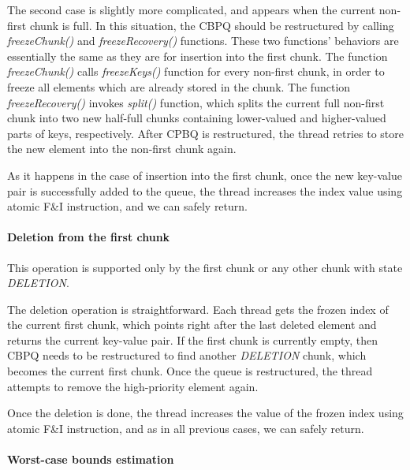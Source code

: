 \documentclass{article}
\begin{document}
The second case is slightly more complicated, and appears when the current non-first chunk is full. In this situation, the CBPQ should be restructured by calling \textit{freezeChunk()} and \textit{freezeRecovery()} functions. These two functions' behaviors are essentially the same as they are for insertion into the first chunk. The function \textit{freezeChunk()} calls \textit{freezeKeys()} function for every non-first chunk, in order to freeze all elements which are already stored in the chunk. The function \textit{freezeRecovery()} invokes \textit{split()} function, which splits the current full non-first chunk into two new half-full chunks containing lower-valued and higher-valued parts of keys, respectively. After CPBQ is restructured, the thread retries to store the new element into the non-first chunk again.\par

As it happens in the case of insertion into the first chunk, once the new key-value pair is successfully added to the queue, the thread increases the index value using atomic F\&I instruction, and we can safely return.

\paragraph{Deletion from the first chunk}\mbox{}\par
This operation is supported only by the first chunk or any other chunk with state \emph{DELETION}.\par

The deletion operation is straightforward. Each thread gets the frozen index of the current first chunk, which points right after the last deleted element and returns the current key-value pair. If the first chunk is currently empty, then CBPQ needs to be restructured to find another \emph{DELETION} chunk, which becomes the current first chunk. Once the queue is restructured, the thread attempts to remove the high-priority element again.\par

Once the deletion is done, the thread increases the value of the frozen index using atomic F\&I instruction, and as in all previous cases, we can safely return.
\pagebreak

\paragraph{Worst-case bounds estimation}\mbox{}\par 
\end{document}
